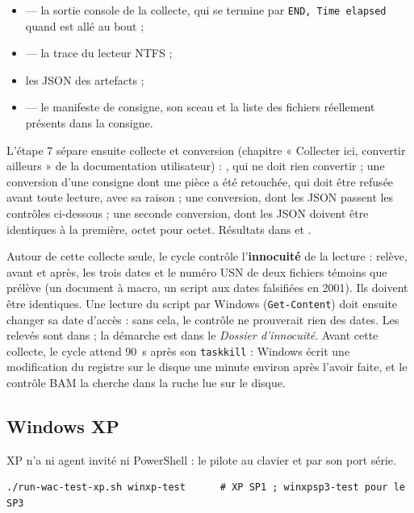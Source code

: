 \documentclass[11pt,a4paper,oneside]{report}
\begin{document}
\begin{itemize}
  \item {} — la sortie console de la collecte, qui se termine par
    \texttt{END, Time elapsed} quand \wac{} est allé au bout ;
  \item {} — la trace du lecteur NTFS ;
  \item les JSON des artefacts ;
  \item {} — le manifeste de consigne, son sceau et la liste
    des fichiers réellement présents dans la consigne.
\end{itemize}

L'étape 7 sépare ensuite collecte et conversion (chapitre « Collecter ici,
convertir ailleurs » de la documentation utilisateur) : 
 , qui ne doit rien convertir ; une conversion d'une
consigne dont une pièce a été retouchée, qui doit être refusée avant toute
lecture, avec sa raison ; une conversion, dont les JSON passent les contrôles
ci-dessous ; une seconde conversion, dont les JSON doivent être identiques à la
première, octet pour octet. Résultats dans  et
.

Autour de cette collecte seule, le cycle contrôle l'\textbf{innocuité} de la
lecture :  relève, avant et après, les trois
dates et le numéro USN de deux fichiers témoins que  prélève (un
document à macro, un script aux dates falsifiées en 2001). Ils doivent être
identiques. Une lecture du script par Windows (\texttt{Get-Content}) doit
ensuite changer sa date d'accès : sans cela, le contrôle ne prouverait rien des
dates. Les relevés sont dans  ; la démarche est dans
le \emph{Dossier d'innocuité}. Avant cette collecte, le cycle attend 90~s après
son \texttt{taskkill} : Windows écrit une modification du registre sur le
disque une minute environ après l'avoir faite, et le contrôle BAM la cherche
dans la ruche lue sur le disque.

\subsection*{Windows XP}

XP n'a ni agent invité ni PowerShell :  le pilote
au clavier et par son port série.

\begin{lstlisting}
./run-wac-test-xp.sh winxp-test      # XP SP1 ; winxpsp3-test pour le SP3
\end{lstlisting}
\end{document}
